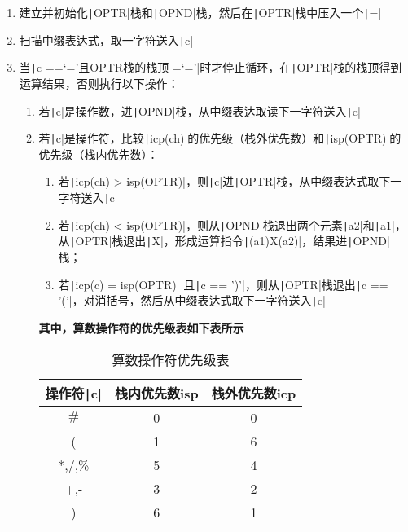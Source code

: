 \documentclass[10pt,a4paper]{article}
\begin{document}
	\begin{enumerate}
		\item 建立并初始化\texttt|OPTR|栈和\texttt|OPND|栈，然后在\texttt|OPTR|栈中压入一个\texttt|=|
		\item 扫描中缀表达式，取一字符送入\texttt|c|
		\item 当\texttt|c ==‘=’且OPTR栈的栈顶 =‘=’|时才停止循环，在\texttt|OPTR|栈的栈顶得到运算结果，否则执行以下操作：
		\begin{enumerate}
			\item 若\texttt|c|是操作数，进\texttt|OPND|栈，从中缀表达取读下一字符送入\texttt|c|
			\item 若\texttt|c|是操作符，比较\texttt|icp(ch)|的优先级（栈外优先数）和\texttt|isp(OPTR)|的优先级（栈内优先数）：
			\begin{enumerate}
				\item 若\texttt|icp(ch) > isp(OPTR)|，则\texttt|c|进\texttt|OPTR|栈，从中缀表达式取下一字符送入\texttt|c|
				\item 若\texttt|icp(ch) < isp(OPTR)|，则从\texttt|OPND|栈退出两个元素\texttt|a2|和\texttt|a1|，从\texttt|OPTR|栈退出\texttt|X|，形成运算指令\texttt|(a1)X(a2)|，结果进\texttt|OPND|栈；
				\item 若\texttt|icp(c) = isp(OPTR)| 且\texttt|c == ')'|，则从\texttt|OPTR|栈退出\texttt|c == '('|，对消括号，然后从中缀表达式取下一字符送入\texttt|c|
			\end{enumerate}
			\textbf{其中，算数操作符的优先级表如下表所示}
			\begin{center}
				\begin{table}[H]
					\centering
					\begin{tabular}{c|cc}
						\hline
						操作符\texttt|c|&栈内优先数isp&栈外优先数icp\\
						\hline
						$\#$ & 0 & 0\\
						( & 1 & 6\\
						*,/,\% & 5 & 4\\
						+,- & 3 & 2\\
						) & 6 & 1\\
						\hline
					\end{tabular}
					\caption{算数操作符优先级表}
					\label{优先级}
				\end{table}
			\end{center}
		\end{enumerate}
	\end{enumerate}
\end{document}

